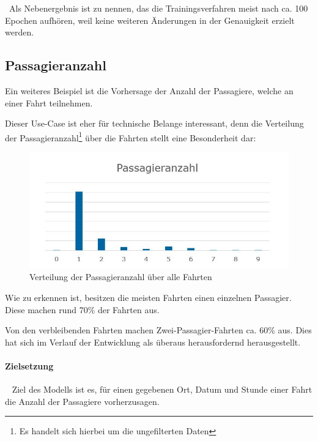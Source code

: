 ~\newline Als Nebenergebnis ist zu nennen, das die Trainingsverfahren meist nach ca. 100 Epochen aufhören, weil keine weiteren Änderungen in der Genauigkeit erzielt werden.\newpage
\subsection{Passagieranzahl}
\label{sec:PasPred}
Ein weiteres Beispiel ist die Vorhersage der Anzahl der Passagiere, welche an einer Fahrt teilnehmen. 

Dieser Use-Case ist eher für technische Belange interessant, denn die Verteilung der Passagieranzahl\footnote{Es handelt sich hierbei um die ungefilterten Daten} über die Fahrten stellt eine Besonderheit dar: 


\begin{figure}[h]
	\begin{center}
		\includegraphics[width=0.8\linewidth]{Bilder/PassagierVerteilung}
		\caption[Verteilung der Passagieranzahl]{Verteilung der Passagieranzahl über alle Fahrten}
		\label{fig:PassagierVerteilung}
	\end{center}
\end{figure}


Wie zu erkennen ist, besitzen die meisten Fahrten einen einzelnen Passagier. Diese machen rund 70\% der Fahrten aus.

Von den verbleibenden Fahrten machen Zwei-Passagier-Fahrten ca. 60\% aus.  Dies hat sich im Verlauf der Entwicklung als überaus herausfordernd herausgestellt. 
\paragraph{Zielsetzung} ~\newline
Ziel des Modells ist es, für einen gegebenen Ort, Datum und Stunde einer Fahrt die Anzahl der Passagiere vorherzusagen. 

